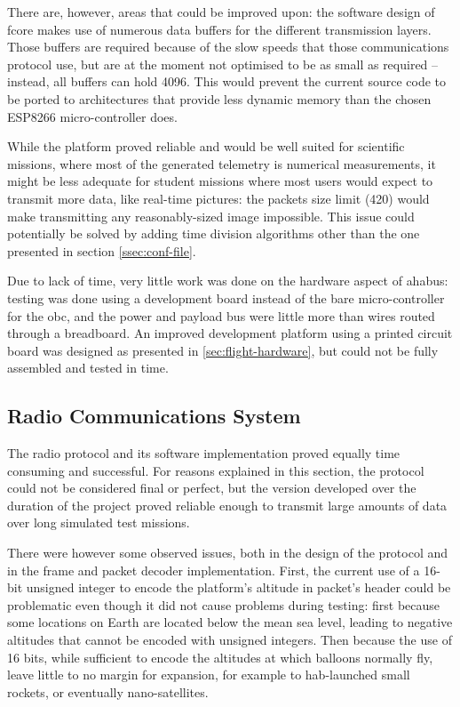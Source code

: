 There are, however, areas that could be improved upon: the software design of
\acrshort{fcore} makes use of numerous data buffers for the different
transmission layers. Those buffers are required because of the slow speeds that
those communications protocol use, but are at the moment not optimised to be as
small as required – instead, all buffers can hold \SI{4096}{\byte}. This would
prevent the current source code to be ported to architectures that provide less
dynamic memory than the chosen ESP8266 micro-controller does.

While the platform proved reliable and would be well suited for scientific
missions, where most of the generated telemetry is numerical measurements, it
might be less adequate for student missions where most users would expect to
transmit more data, like real-time pictures: the packets size limit
(\SI{420}{\byte}) would make transmitting any reasonably-sized image impossible.
This issue could potentially be solved by adding time division algorithms other
than the one presented in section \ref{ssec:conf-file}.

Due to lack of time, very little work was done on the hardware aspect of
\acrshort{ahabus}: testing was done using a development board instead of the
bare micro-controller for the \acrlong{obc}, and the power and payload bus were
little more than wires routed through a breadboard. An improved development
platform using a printed circuit board was designed as presented in
\ref{sec:flight-hardware}, but could not be fully assembled and tested in time.

\subsection{Radio Communications System}

The radio protocol and its software implementation proved equally time consuming
and successful. For reasons explained in this section, the protocol could not
be considered final or perfect, but the version developed over the duration of
the project proved reliable enough to transmit large amounts of data over long
simulated test missions.

There were however some observed issues, both in the design of the protocol and
in the frame and packet decoder implementation. First, the current use of a
16-bit unsigned integer to encode the platform's altitude in packet's header
could be problematic even though it did not cause problems during testing: first
because some locations on Earth are located below the mean sea level, leading to
negative altitudes that cannot be encoded with unsigned integers. Then because
the use of 16 bits, while sufficient to encode the altitudes at which balloons
normally fly, leave little to no margin for expansion, for example to
\acrshort{hab}-launched small rockets, or eventually nano-satellites.

